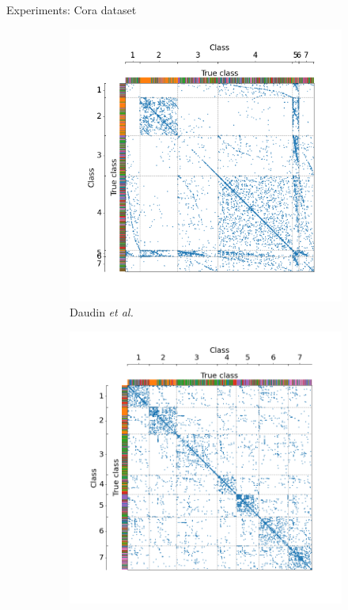 \documentclass[final]{beamer}
\newlength{\colwidth}
\begin{document}
\begin{frame}[t]
\begin{columns}[t]
\begin{column}{\colwidth}
\begin{block}{Experiments: Cora dataset}
\begin{figure}[H]
\begin{subfigure}{0.36\linewidth}
            \includegraphics[width=\linewidth, trim={45 25 35 40}, clip]{figures/cora_sbm.png}
            \caption{Daudin \textit{et al.}}
            \label{fig:cora_SBM}
          \end{subfigure}
          \hfill
          \medskip
          \hfill
          \begin{subfigure}{0.36\linewidth}
            \centering
            \includegraphics[width=\linewidth, trim={45 25 35 40}, clip]{figures/cora_Newman.png}

\end{subfigure}
\end{figure}
\end{block}
\end{column}
\end{columns}
\end{frame}
\end{document}
